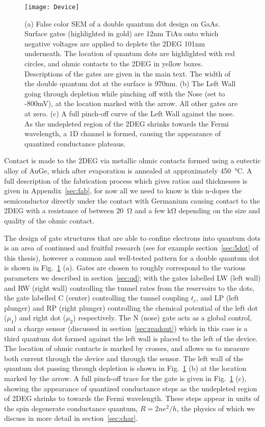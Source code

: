 \begin{figure}
  \texttt{[image: Device]}
  \caption[SEM Image of a Double Quantum Dot on GaAs]
  {\label{fig:dd_design}(a) False color SEM of a double quantum dot design on GaAs. Surface gates (highlighted in gold) are
  12nm TiAu onto which negative voltages are applied to deplete the 2DEG 101nm underneath. The location of quantum dots are
  highlighted with red circles, and ohmic contacts to the 2DEG in yellow boxes. Descriptions of the gates are given in the
  main text. The width of the double quantum dot at the surface is 970nm. (b) The Left Wall going through depletion while
  pinching off with the Nose (set to -800mV), at the location marked with the arrow. All other gates are at zero. (c)
  A full pinch-off curve of the Left Wall against the nose. As the undepleted region of the 2DEG shrinks towards the Fermi
  wavelength, a 1D channel is formed, causing the appearance of quantized conductance plateaus.}
\end{figure}

Contact is made to the 2DEG via metallic ohmic contacts formed using a eutectic alloy of AuGe, which after evaporation is annealed
at approximately \SI{450}{\celsius}. A full description of the fabrication process which gives ratios and thicknesses is given
in Appendix~\ref{sec:fab}, for now all we need to know is this n-dopes the semiconductor directly under the contact with Germanium
causing contact to the 2DEG with a resistance of between \SI{20}{\ohm} and a few \si{\kilo\ohm} depending on the size and quality
of the ohmic contact.

The design of gate structures that are able to confine electrons into quantum dots is an area of continued and fruitful research (see for
example section~\ref{sec:5dot} of this thesis), however a common and well-tested pattern for a double quantum dot is shown in Fig.~\ref{fig:dd_design} (a).
Gates are chosen to roughly correspond to the various parameters we described in section~\ref{sec:qd}; with the gates labelled LW (left wall)
and RW (right wall) controlling the tunnel rates from the reservoirs to the dots, the gate labelled C (center) controlling the tunnel coupling
$t_c$, and LP (left plunger) and RP (right plunger) controlling the chemical potential of the left dot ($\mu_1$) and right dot ($\mu_2$) respectively.
The N (nose) gate acts as a global control, and a charge sensor (discussed in section~\ref{sec:readout}) which in this case is a third quantum dot formed
against the left wall is placed to the left of the device. The location of ohmic contacts is marked by crosses, and allows us to measure both current
through the device and through the sensor. The left wall of the quantum dot passing through depletion is shown in Fig.~\ref{fig:dd_design} (b) at the
location marked by the arrow. A full pinch-off trace for the gate is given in Fig.~\ref{fig:dd_design} (c), showing the appearance of quantized
conductance steps as the undepleted region of 2DEG shrinks to towards the Fermi wavelength. These steps appear in units of the spin degenerate conductance quantum,
$R = 2 n e^2/h$, the physics of which we discuss in more detail in section~\ref{sec:char}.

